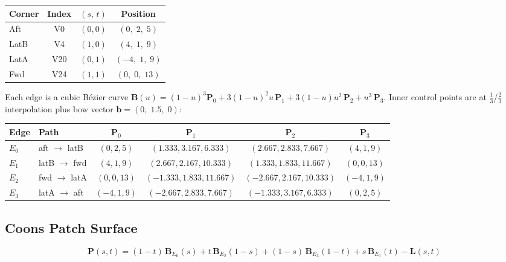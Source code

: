 \documentclass[11pt,a4paper]{article}
\begin{document}
\begin{center}
\begin{tabular}{lccc}
\toprule
Corner & Index & $(s,\,t)$ & Position \\
\midrule
Aft  & V0  & $(0,0)$ & $(0,\;2,\;5)$ \\
LatB & V4  & $(1,0)$ & $(4,\;1,\;9)$ \\
LatA & V20 & $(0,1)$ & $(-4,\;1,\;9)$ \\
Fwd  & V24 & $(1,1)$ & $(0,\;0,\;13)$ \\
\bottomrule
\end{tabular}
\end{center}

Each edge is a cubic B\'{e}zier curve
$\mathbf{B}(u) = (1\!-\!u)^3 \mathbf{P}_0 + 3(1\!-\!u)^2 u\,\mathbf{P}_1
+ 3(1\!-\!u)u^2\,\mathbf{P}_2 + u^3\,\mathbf{P}_3$.
Inner control points are at $\frac{1}{3}$/$\frac{2}{3}$ interpolation
plus bow vector $\mathbf{b} = (0,\;1.5,\;0)$:

\begin{center}
\small
\begin{tabular}{llcccc}
\toprule
Edge & Path & $\mathbf{P}_0$ & $\mathbf{P}_1$ & $\mathbf{P}_2$ & $\mathbf{P}_3$ \\
\midrule
$E_0$ & aft $\to$ latB
  & $(0, 2, 5)$ & $(1.333, 3.167, 6.333)$ & $(2.667, 2.833, 7.667)$ & $(4, 1, 9)$ \\
$E_1$ & latB $\to$ fwd
  & $(4, 1, 9)$ & $(2.667, 2.167, 10.333)$ & $(1.333, 1.833, 11.667)$ & $(0, 0, 13)$ \\
$E_2$ & fwd $\to$ latA
  & $(0, 0, 13)$ & $(-1.333, 1.833, 11.667)$ & $(-2.667, 2.167, 10.333)$ & $(-4, 1, 9)$ \\
$E_3$ & latA $\to$ aft
  & $(-4, 1, 9)$ & $(-2.667, 2.833, 7.667)$ & $(-1.333, 3.167, 6.333)$ & $(0, 2, 5)$ \\
\bottomrule
\end{tabular}
\end{center}

\subsection{Coons Patch Surface}

\begin{equation}\label{eq:coons}
  \mathbf{P}(s,t) = (1\!-\!t)\,\mathbf{B}_{E_0}(s) + t\,\mathbf{B}_{E_2}(1\!-\!s)
                   + (1\!-\!s)\,\mathbf{B}_{E_3}(1\!-\!t) + s\,\mathbf{B}_{E_1}(t)
                   - \mathbf{L}(s,t)
\end{equation}
\end{document}
